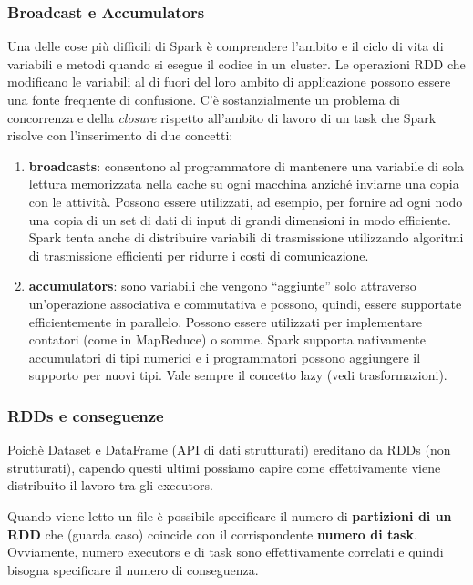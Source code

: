 \documentclass[12pt,italian]{article}
\begin{document}
\subsubsection{Broadcast e Accumulators}\label{sec:broadcastAndAccumulators}
 Una delle cose più difficili di Spark è comprendere l'ambito e il ciclo di vita di variabili e metodi quando si esegue il codice in un cluster. Le operazioni RDD che modificano le variabili al di fuori del loro ambito di applicazione possono essere una fonte frequente di confusione. C'è sostanzialmente un problema di concorrenza e della \textit{closure} rispetto all'ambito di lavoro di un task che Spark risolve con l'inserimento di due concetti:
\begin{enumerate}
	\item \textbf{broadcasts}:  consentono al programmatore di mantenere una variabile di sola lettura memorizzata nella cache su ogni macchina anziché inviarne una copia con le attività. Possono essere utilizzati, ad esempio, per fornire ad ogni nodo una copia di un set di dati di input di grandi dimensioni in modo efficiente. Spark tenta anche di distribuire variabili di trasmissione utilizzando algoritmi di trasmissione efficienti per ridurre i costi di comunicazione.
	\item \textbf{accumulators}: sono variabili che vengono “aggiunte” solo attraverso un'operazione associativa e commutativa e possono, quindi, essere supportate efficientemente in parallelo. Possono essere utilizzati per implementare contatori (come in MapReduce) o somme. Spark supporta nativamente accumulatori di tipi numerici e i programmatori possono aggiungere il supporto per nuovi tipi. Vale sempre il concetto lazy (vedi trasformazioni).
\end{enumerate}

\subsubsection{RDDs e conseguenze}
Poichè Dataset e DataFrame (API di dati strutturati) ereditano da RDDs (non strutturati), capendo questi ultimi possiamo capire come effettivamente viene distribuito il lavoro tra gli executors.

Quando viene letto un file è possibile specificare il numero di \textbf{partizioni di un RDD} che (guarda caso) coincide con il corrispondente \textbf{numero di task}.
Ovviamente, numero executors e di task sono effettivamente correlati e quindi bisogna specificare il numero di conseguenza.
\end{document}
